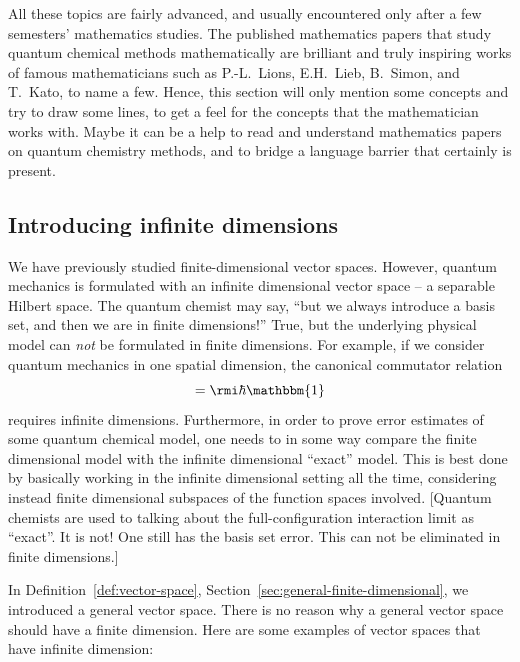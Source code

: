 All these topics are fairly advanced, and usually encountered only after a few semesters' mathematics studies. The published mathematics papers that study quantum chemical methods mathematically are brilliant and truly inspiring works of famous mathematicians such as P.-L.~Lions, E.H.~Lieb, B.~Simon, and T.~Kato, to name a few. Hence, this section will only mention some concepts and try to draw some lines, to get a feel for the concepts that the mathematician works with. Maybe it can be a help to read and understand mathematics papers on quantum chemistry methods, and to bridge a language barrier that certainly is present.




\subsection{Introducing infinite dimensions}

We have previously studied finite-dimensional vector spaces. However, quantum mechanics is formulated with an infinite dimensional vector space -- a separable Hilbert space. The quantum chemist may say, ``but we always introduce a basis set, and then we are in finite dimensions!'' True, but the underlying physical model can \emph{not} be formulated in finite dimensions. For example, if we consider quantum mechanics in one spatial dimension, the canonical commutator relation
\begin{equation}
    [\hat{x}, \hat{p}_x] = \rmi \hbar \mathbbm{1}
\end{equation}
requires infinite dimensions. Furthermore, in order to prove error estimates of some quantum chemical model, one needs to in some way compare the finite dimensional model with the infinite dimensional ``exact'' model. This is best done by basically working in the infinite dimensional setting all the time, considering instead finite dimensional subspaces of the function spaces involved. [Quantum chemists are used to talking about the full-configuration interaction limit as ``exact''. It is not! One still has the basis set error. This can not be eliminated in finite dimensions.]

In Definition~\ref{def:vector-space}, Section~\ref{sec:general-finite-dimensional}, we introduced a general vector space. There is no reason why a general vector space should have a finite dimension. Here are some examples of vector spaces that have infinite dimension:

